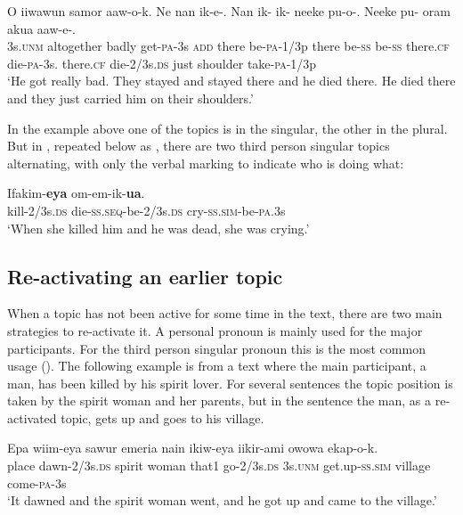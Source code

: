 \ea%
\label{ex:x1676}
\gll O  iiwawun  samor  aaw-o-k.  Ne  nan  ik-e-. Nan  ik-  ik-  neeke  pu-o-.  Neeke  pu-  oram akua  aaw-e-.\\
3s.\textsc{unm}  altogether  badly  get-\textsc{pa}-3s  \textsc{add}  there  be-\textsc{pa}-1/3p there  be-\textsc{ss}  be-\textsc{ss}  there.\textsc{cf}  die-\textsc{pa}-3s.  there.\textsc{cf}  die-2/3s.\textsc{ds}  just shoulder  take-\textsc{pa}-1/3p    \\
\glt`He got really bad. They stayed and stayed there and he died there. He died there and they just carried him on their shoulders.'
\z


In the example above one of the topics is in the singular, the other in the plural. But in , repeated below as , there are two third person singular topics alternating, with only the verbal marking to indicate who is doing what:

\ea%
\label{ex:x1920}
\gll Ifakim-\textbf{eya}   om-em-ik-\textbf{ua}. \\
kill-2/3s.\textsc{ds}  die-\textsc{ss}.\textsc{seq}-be-2/3s.\textsc{ds}  cry-\textsc{ss}.\textsc{sim}-be-\textsc{pa}.3s     \\
\glt`When she killed him and he was dead, she was crying.'
\z


\subsection{Re-activating an earlier topic}

When a topic has not been active for some time in the text, there are two main strategies to re-activate it. A personal pronoun is mainly used for the major participants. For the third person singular pronoun this is the most common usage (). The following example is from a text where the main participant, a man, has been killed by his spirit lover. For several sentences the topic position is taken by the spirit woman and her parents, but in the sentence  the man, as a re-activated topic, gets up and goes to his village.

\ea%
\label{ex:x1921}
\gll Epa  wiim-eya  sawur  emeria  nain  ikiw-eya   iikir-ami  owowa  ekap-o-k. \\
place  dawn-2/3s.\textsc{ds}  spirit  woman  that1  go-2/3s.\textsc{ds} 3s.\textsc{unm}  get.up-\textsc{ss}.\textsc{sim}  village  come-\textsc{pa}-3s     \\
\glt`It dawned and the spirit woman went, and he got up and came to the village.'
\z


